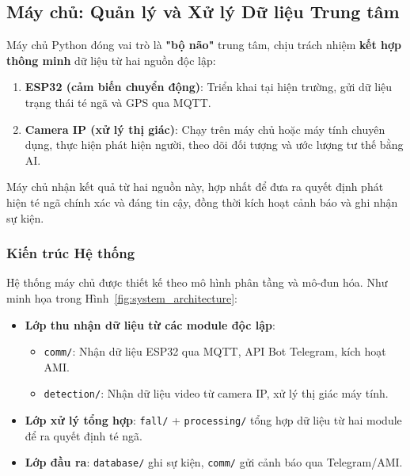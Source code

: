 
\subsection{Máy chủ: Quản lý và Xử lý Dữ liệu Trung tâm}
\label{sec:server_overview}

Máy chủ Python đóng vai trò là \textbf{"bộ não"} trung tâm, chịu trách nhiệm \textbf{kết hợp thông minh} dữ liệu từ hai nguồn độc lập: 
\begin{enumerate}
    \item \textbf{ESP32 (cảm biến chuyển động)}: Triển khai tại hiện trường, gửi dữ liệu trạng thái té ngã và GPS qua MQTT.
    \item \textbf{Camera IP (xử lý thị giác)}: Chạy trên máy chủ hoặc máy tính chuyên dụng, thực hiện phát hiện người, theo dõi đối tượng và ước lượng tư thế bằng AI.
\end{enumerate}

Máy chủ nhận kết quả từ hai nguồn này, hợp nhất để đưa ra quyết định phát hiện té ngã chính xác và đáng tin cậy, đồng thời kích hoạt cảnh báo và ghi nhận sự kiện.

\subsubsection{Kiến trúc Hệ thống}
\label{subsubsec:system_overview}

Hệ thống máy chủ được thiết kế theo mô hình phân tầng và mô-đun hóa. Như minh họa trong Hình~\ref{fig:system_architecture}:

\begin{itemize}
    \item \textbf{Lớp thu nhận dữ liệu từ các module độc lập}:
    \begin{itemize}
        \item \texttt{comm/}: Nhận dữ liệu ESP32 qua MQTT, API Bot Telegram, kích hoạt AMI.
        \item \texttt{detection/}: Nhận dữ liệu video từ camera IP, xử lý thị giác máy tính.
    \end{itemize}
    \item \textbf{Lớp xử lý tổng hợp}: \texttt{fall/} + \texttt{processing/} tổng hợp dữ liệu từ hai module để ra quyết định té ngã.
    \item \textbf{Lớp đầu ra}: \texttt{database/} ghi sự kiện, \texttt{comm/} gửi cảnh báo qua Telegram/AMI.
\end{itemize}

